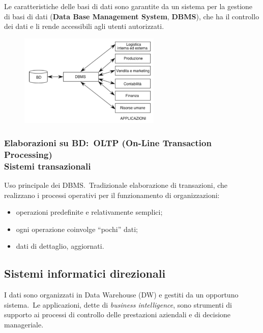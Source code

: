 Le caratteristiche delle basi di dati sono garantite da un sistema per la gestione di basi di dati (\textbf{Data Base Management System}, \textbf{DBMS}), che ha il controllo dei dati e li rende accessibili agli utenti autorizzati.

\begin{figure}[H]
	\centering
	\includegraphics[width=0.6\textwidth]{immagini/Sistema_informatico_operativo.png}
\end{figure}

\subsubsection{Elaborazioni su BD:\ OLTP (On-Line Transaction Processing) \\Sistemi transazionali}
Uso principale dei DBMS.\
Tradizionale elaborazione di transazioni, che realizzano i processi operativi per il funzionamento di organizzazioni:
\begin{itemize}
	\item operazioni predefinite e relativamente semplici;
	\item ogni operazione coinvolge ``pochi'' dati;
	\item dati di dettaglio, aggiornati.
\end{itemize}

\subsection{Sistemi informatici direzionali}

I dati sono organizzati in Data Warehouse (DW) e gestiti da un opportuno sistema.\
Le applicazioni, dette di \textit{business intelligence}, sono strumenti di supporto ai processi di controllo delle prestazioni aziendali e di decisione manageriale.

